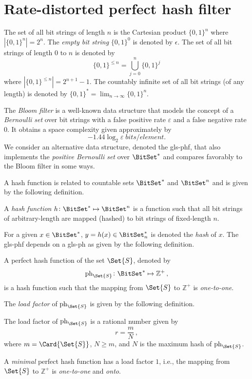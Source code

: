 \documentclass[ ../main.tex]{subfiles}
\begin{document}
\section{Rate-distorted perfect hash filter}
\label{sec:phf}

The set of all bit strings of length $n$ is the Cartesian product $\{0,1\}^n$ where $|\{0,1\}^n| = 2^n$.
The \emph{empty bit string} $\{0,1\}^0$ is denoted by $\epsilon$.
The set of all bit strings of length $0$ to $n$ is denoted by
$$
\{0,1\}^{\leq n} = \bigcup_{j=0}^{n} \{0,1\}^j
$$
where $|\{0,1\}^{\leq n}| = 2^{n+1} - 1$.
The countably infinite set of all bit strings (of any length) is denoted by
$\{0,1\}^* = \lim_{n \to \infty} \{0,1\}^n$.

The \emph{Bloom filter}\cite{bf} is a well-known data structure that models
the concept of a \emph{Bernoulli set} over bit strings with a false positive
rate $\varepsilon$ and a false negative rate $0$.
It obtains a space complexity given approximately by
\begin{equation}
    -1.44 \log_2 \varepsilon \; \si{bits \per element}.
\end{equation}
We consider an alternative data structure, denoted the \gls{gls-phf}, that also implements the \emph{positive Bernoulli set} over $\BitSet^*$ and compares favorably to the Bloom filter in some ways.

A hash function is related to countable sets $\BitSet^*$ and $\BitSet^n$ and is given by the following definition.
\begin{definition}
A \emph{hash function} $h \colon \BitSet^* \mapsto \BitSet^n$ is a function such that all bit strings of arbitrary-length are mapped (hashed) to bit strings of fixed-length $n$.
\end{definition}
For a given $x \in \BitSet^*$, $y = h(x) \in \BitSet^*_n$ is denoted the \emph{hash} of $x$. The \gls{gls-phf} depends on a \gls{gls-ph} as given by the following definition.
\begin{definition}
A perfect hash function of the set $\Set{S}$, denoted by
\begin{equation}
    \ph_{\Set{S}} \colon \BitSet^* \mapsto \mathbb{Z}^{+}\,,
\end{equation}
is a hash function such that the mapping from $\Set{S}$ to $\mathbb{Z}^+$ is \emph{one-to-one}.
\end{definition}
The \emph{load factor} of $\ph_{\Set{S}}$ is given by the following definition.
\begin{definition}
\label{def:loadfactor}
The load factor of $\ph_{\Set{S}}$ is a rational number given by
\begin{equation}
\label{eq:loadfactor}
    r = \frac{m}{N}\,,
\end{equation}
where $m = \Card{\Set{S}}$, $N \geq m$, and $N$ is the maximum hash of $\ph_{\Set{S}}$.
\end{definition}
\begin{definition}
A \emph{minimal} perfect hash function has a load factor $1$, i.e., the mapping from $\Set{S}$ to $\mathbb{Z}^+$ is \emph{one-to-one} and \emph{onto}.
\end{definition}
\end{document}
